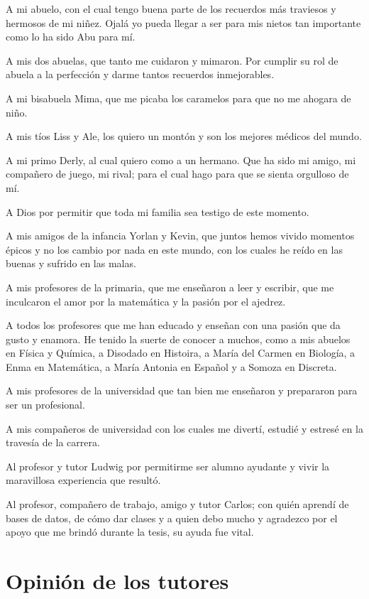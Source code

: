 \documentclass[a4paper,openright,11pt,oneside]{book}
\begin{document}
A mi abuelo, con el cual tengo buena parte de los recuerdos más traviesos y hermosos de mi niñez. Ojalá yo pueda llegar a ser para mis nietos tan importante como lo ha sido Abu para mí.

A mis dos abuelas, que tanto me cuidaron y mimaron. Por cumplir su rol de abuela a la perfección y darme tantos recuerdos inmejorables.

A mi bisabuela Mima, que me picaba los caramelos para que no me ahogara de niño.

A mis tíos Liss y Ale, los quiero un montón y son los mejores médicos del mundo.

A mi primo Derly, al cual quiero como a un hermano. Que ha sido mi amigo, mi compañero de juego, mi rival; para el cual hago para que se sienta orgulloso de mí.

A Dios por permitir que toda mi familia sea testigo de este momento.

A mis amigos de la infancia Yorlan y Kevin, que juntos hemos vivido momentos épicos y no los cambio por nada en este mundo, con los cuales he reído en las buenas y sufrido en las malas.

A mis profesores de la primaria, que me enseñaron a leer y escribir, que me inculcaron el amor por la matemática y la pasión por el ajedrez.

A todos los profesores que me han educado y enseñan con una pasión que da gusto y enamora. He tenido la suerte de conocer a muchos, como a mis abuelos en Física y Química, a Disodado en Histoira, a María del Carmen en Biología, a Enma en Matemática, a María Antonia en Español y a Somoza en Discreta.

A mis profesores de la universidad que tan bien me enseñaron y prepararon para ser un profesional.

A mis compañeros de universidad con los cuales me divertí, estudié y estresé en la travesía de la carrera. 

Al profesor y tutor Ludwig por permitirme ser alumno ayudante y vivir la maravillosa experiencia que resultó.

Al profesor, compañero de trabajo, amigo y tutor Carlos; con quién aprendí de bases de datos, de cómo dar clases y a quien debo mucho y agradezco por el apoyo que me brindó durante la tesis, su ayuda fue vital.


\chapter*{Opinión de los tutores}\label{chapter:supervisor_opinion}
	
\end{document}

